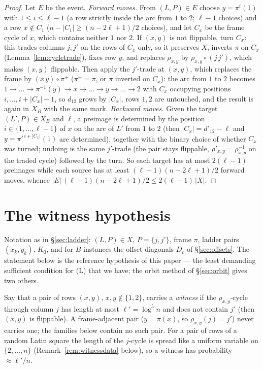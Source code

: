 \documentclass[11pt]{article}
\theoremstyle{definition}
\begin{document}
\begin{proof}
Let $E$ be the event.  \emph{Forward moves.}  From $(L,P)\in E$ choose $y=\pi^i(1)$ with
$1\le i\le\ell-1$ (a row strictly inside the arc from $1$ to $2$; $\ell-1$ choices) and a row
$x\notin C_1$ ($n-|C_1|\ge(n-2\ell+1)/2$ choices), and let $C_x$ be the frame cycle of $x$,
which contains neither $1$ nor $2$.  If $(x,y)$ is not flippable, turn $C_x$: this trades
columns $j,j'$ on the rows of $C_x$ only, so it preserves $X$, inverts $\pi$ on $C_x$
(Lemma~\ref{lem:cycletrade}), fixes row $y$, and replaces $\rho_{x,y}$ by
$\rho_{x,y}\circ(j\,j')$, which makes $(x,y)$ flippable.  Then apply the $j'$-trade at
$(x,y)$, which replaces the frame by $(x\,y)\circ\pi^{\pm}$ ($\pi^\pm=\pi$, or $\pi$ inverted
on $C_x$): the arc from $1$ to $2$ becomes
$1\to\dots\to\pi^{-1}(y)\to x\to\dots\to y\to\dots\to2$ with $C_x$ occupying
positions $i,\dots,i+|C_x|-1$, so $d_{12}$ grows by $|C_x|$, rows $1,2$ are untouched, and the result
is again in $X_B$ with the same mark.  \emph{Backward moves.}  Given the target
$(L',P)\in X_B$ and $\ell$, a preimage is determined by the position $i\in\{1,\dots,\ell-1\}$
of $x$ on the arc of $L'$ from $1$ to $2$ (then $|C_x|=d'_{12}-\ell$ and
$y=\pi'^{\,i+|C_x|}(1)$ are determined), together with the binary choice of whether $C_x$ was turned; undoing is the
same $j'$-trade (the pair stays flippable, $\rho'_{x,y}=\rho_{x,y}^{-1}$ on the traded
cycle) followed by the turn.  So each target has at most $2(\ell-1)$ preimages while each
source has at least $(\ell-1)(n-2\ell+1)/2$ forward moves, whence
$|E|\,(\ell-1)(n-2\ell+1)/2\le2(\ell-1)\,|X|$.
\end{proof}


\section{The witness hypothesis}\label{sec:witness}

Notation as in \S\ref{sec:ladder}: $(L,P)\in X$, $P=\{j,j'\}$, frame $\pi$, ladder pairs
$(x_k,y_k)$, $K_0$, and for $B$-instances the offset diagonals $D_c$ of
\S\ref{sec:offsets}.  The statement below is the reference hypothesis of this paper --- the
least demanding sufficient condition for (L) that we have; the orbit method of
\S\ref{sec:orbit} gives two others.

Say that a pair of rows
$(x,y)$, $x,y\notin\{1,2\}$, carries a \emph{witness} if the
$\rho_{x,y}$-cycle through column $j$ has length at most
$\ell'=\log^5n$ and does not contain $j'$ (then $(x,y)$ is flippable).
A frame-adjacent pair ($y=\pi(x)$, so $\rho_{x,y}(j)=j'$) never
carries one; the families below contain no such pair.
For a pair of rows of a random Latin square the length of the
$j$-cycle is spread like a uniform variable on $\{2,\dots,n\}$
(Remark~\ref{rem:witnessdata} below), so a witness has probability
$\approx\ell'/n$.
\end{document}
